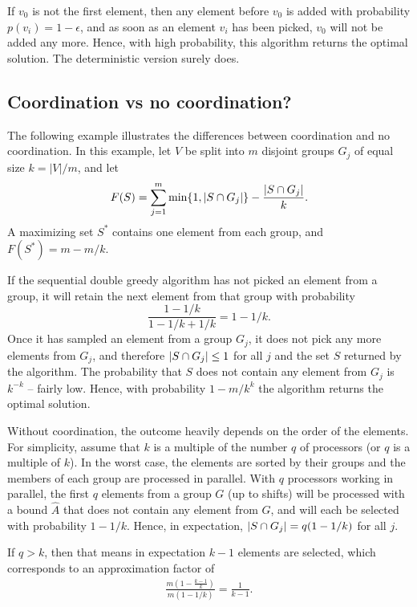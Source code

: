 If $v_0$ is not the first element, then any element before $v_0$ is added with probability $p(v_i) = 1-\epsilon$, and as soon as an element $v_i$ has been picked, $v_0$ will not be added any more. Hence, with high probability, this algorithm returns the optimal solution. The deterministic version surely does.


\subsection{Coordination vs no coordination?}
The following example illustrates the differences between coordination and no coordination.
In this example, let $V$ be split into $m$ disjoint groups $G_j$ of equal size $k = |V|/m$, and let
\begin{equation}
  \label{eq:1}
  F(S) = \sum_{j=1}^m \min\{1, |S \cap G_j|\} - \frac{|S \cap G_j|}{k}.
\end{equation}
A maximizing set $S^*$ contains one element from each group, and $F(S^*) = m - m/k$.

If the sequential double greedy algorithm has not picked an element from a group, it will retain the next element from that group with probability
\begin{equation}
  \label{eq:2}
  \frac{1 - 1/k}{1 - 1/k + 1/k} = 1 - 1/k.
\end{equation}
Once it has sampled an element from a group $G_j$, it does not pick any more elements from $G_j$, and therefore $|S \cap G_j| \leq 1$ for all $j$ and the set $S$ returned by the algorithm. The probability that $S$ does not contain any element from $G_j$ is $k^{-k}$ -- fairly low. Hence, with probability $1-m/k^k$ the algorithm returns the optimal solution.

Without coordination, the outcome heavily depends on the order of the elements. For simplicity, assume that $k$ is a multiple of the number $q$ of processors (or $q$ is a multiple of $k$). 
In the worst case, the elements are sorted by their groups and the members of each group are processed in parallel. With $q$ processors working in parallel, the first $q$ elements from a group $G$ (up to shifts) will be processed with a bound $\hat{A}$ that does not contain any element from $G$, and will each be selected with probability $1-1/k$. Hence, in expectation, $|S \cap G_j| = q(1-1/k)$ for all $j$. 

If $q > k$, then that means in expectation $k-1$ elements are selected, which corresponds to an approximation factor of
\begin{align}
  \frac{m( 1 - \frac{k-1}{k})}{m(1-1/k)} = \frac{1}{k-1}.
\end{align}
